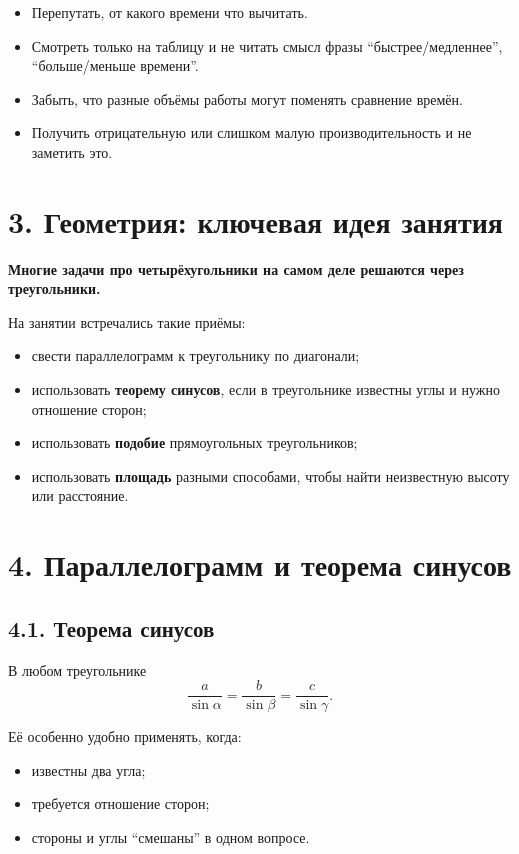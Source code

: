 \documentclass[a4paper,12pt]{article}
\begin{document}
\begin{itemize}
    \item Перепутать, от какого времени что вычитать.
    \item Смотреть только на таблицу и не читать смысл фразы ``быстрее/медленнее'', ``больше/меньше времени''.
    \item Забыть, что разные объёмы работы могут поменять сравнение времён.
    \item Получить отрицательную или слишком малую производительность и не заметить это.
\end{itemize}

\section*{3. Геометрия: ключевая идея занятия}

\textbf{Многие задачи про четырёхугольники на самом деле решаются через треугольники.}

На занятии встречались такие приёмы:

\begin{itemize}
    \item свести параллелограмм к треугольнику по диагонали;
    \item использовать \textbf{теорему синусов}, если в треугольнике известны углы и нужно отношение сторон;
    \item использовать \textbf{подобие} прямоугольных треугольников;
    \item использовать \textbf{площадь} разными способами, чтобы найти неизвестную высоту или расстояние.
\end{itemize}

\section*{4. Параллелограмм и теорема синусов}

\subsection*{4.1. Теорема синусов}

В любом треугольнике
\[
\frac{a}{\sin \alpha}=\frac{b}{\sin \beta}=\frac{c}{\sin \gamma}.
\]

Её особенно удобно применять, когда:

\begin{itemize}
    \item известны два угла;
    \item требуется отношение сторон;
    \item стороны и углы ``смешаны'' в одном вопросе.
\end{itemize}
\end{document}
